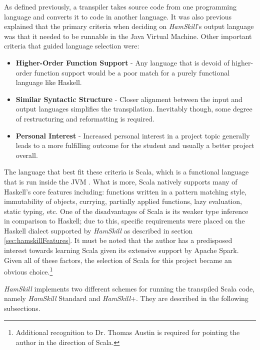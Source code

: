 \documentclass{report}
\begin{document}
As defined previously, a transpiler takes source code from one programming language and converts it to code in another language.  It was also previous explained that the primary criteria when deciding on \textit{HamSkill}'s output language was that it needed to be runnable in the Java Virtual Machine.  Other important criteria that guided language selection were:

\begin{itemize}

	\item \textbf{Higher-Order Function Support} - Any language that is devoid of higher-order function support would be a poor match for a purely functional language like Haskell.
	
	\item \textbf{Similar Syntactic Structure} - Closer alignment between the input and output languages simplifies the transpilation.  Inevitably though, some degree of restructuring and reformatting is required.  
	
	\item \textbf{Personal Interest} - Increased personal interest in a project topic generally leads to a more fulfilling outcome for the student and usually a better project overall.  

\end{itemize}

The language that best fit these criteria is Scala, which is a functional language that is run inside the JVM \cite{whatIsScala}. What is more, Scala natively supports many of Haskell's core features including: functions written in a pattern matching style, immutability of objects, currying, partially applied functions, lazy evaluation, static typing, etc.  One of the disadvantages of Scala is its weaker type inference in comparison to Haskell; due to this, specific requirements were placed on the Haskell dialect supported by \textit{HamSkill} as described in section \ref{sec:hamskillFeatures}.  It must be noted that the author has a predisposed interest towards learning Scala given its extensive support by Apache Spark.  Given all of these factors, the selection of Scala for this project became an obvious choice.\footnote{Additional recognition to Dr. Thomas Austin is required for pointing the author in the direction of Scala.}

\textit{HamSkill} implements two different schemes for running the transpiled Scala code, namely \textit{HamSkill} Standard and \textit{HamSkill}+.  They are described in the following subsections.
\end{document}
